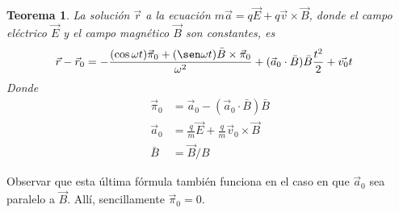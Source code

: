 \documentclass{article}
\newtheorem{theorem}{Teorema}
\begin{document}
  \begin{theorem}
    La solución \(\vec{r}\) a la ecuación \(m \vec{a} = q \vec{E} + q \vec{v} \times \vec{B}\), donde el campo eléctrico \(\vec{E}\) y el campo magnético \(\vec{B}\) son constantes, es
    \begin{align}
      \vec{r} - \vec{r}_0
      &=
      - \frac{(\cos \omega t) \vec{\pi}_0 + (\sen \omega t) \bar{B} \times \vec{\pi}_0}{\omega^2}
      + (\vec{a}_0 \cdot \bar{B}) \bar{B} \frac{t^2}{2}
      + \vec{v_0} t
    \end{align}
    Donde
    \begin{align}
      \vec{\pi}_0
      &=
      \vec{a}_0 - (\vec{a}_0 \cdot \bar{B}) \bar{B}
      \\
      \vec{a}_0
      &=
      \frac{q}{m} \vec{E} + \frac{q}{m} \vec{v}_0 \times \vec{B}
      \\
      \bar{B}
      &=
      \vec{B} / B
    \end{align}
  \end{theorem}

  Observar que esta última fórmula también funciona en el caso en que \(\vec{a}_0\) sea paralelo a \(\vec{B}\).
  Allí, sencillamente \(\vec{\pi}_0 = 0\).
\end{document}

